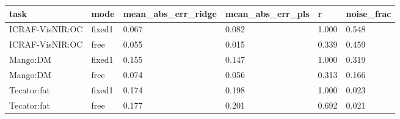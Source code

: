\begin{tabular}{llllll}
\hline
task & mode & mean\_abs\_err\_ridge & mean\_abs\_err\_pls & r & noise\_frac \\
\hline
ICRAF-VisNIR:OC & fixed1 & 0.067 & 0.082 & 1.000 & 0.548 \\
ICRAF-VisNIR:OC & free & 0.055 & 0.015 & 0.339 & 0.459 \\
Mango:DM & fixed1 & 0.155 & 0.147 & 1.000 & 0.319 \\
Mango:DM & free & 0.074 & 0.056 & 0.313 & 0.166 \\
Tecator:fat & fixed1 & 0.174 & 0.198 & 1.000 & 0.023 \\
Tecator:fat & free & 0.177 & 0.201 & 0.692 & 0.021 \\
\hline
\end{tabular}
